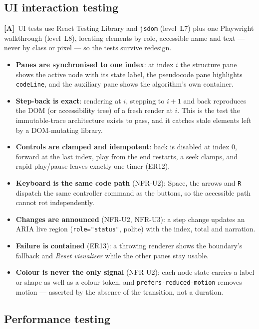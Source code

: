 \documentclass[11pt,a4paper]{article}
\newcommand{\A}{\textcolor{asmc}{\textbf{[A]}}}     %
\newcommand{\ct}[1]{\texttt{#1}}
\begin{document}
\subsection{UI interaction testing}

\A\ UI tests use React Testing Library and \ct{jsdom} (level~L7) plus one Playwright
walkthrough (level~L8), locating elements by role, accessible name and text --- never by class
or pixel --- so the tests survive redesign.

\begin{itemize}[leftmargin=1.4em,topsep=2pt,itemsep=1pt]
  \item \textbf{Panes are synchronised to one index}: at index $i$ the structure pane shows the
        active node with its state label, the pseudocode pane highlights \ct{codeLine}, and the
        auxiliary pane shows the algorithm's own container.
  \item \textbf{Step-back is exact}: rendering at $i$, stepping to $i+1$ and back reproduces the
        DOM (or accessibility tree) of a fresh render at $i$. This is the test the immutable-trace
        architecture exists to pass, and it catches stale elements left by a DOM-mutating library.
  \item \textbf{Controls are clamped and idempotent}: back is disabled at index $0$, forward at
        the last index, play from the end restarts, a seek clamps, and rapid play/pause leaves
        exactly one timer (ER12).
  \item \textbf{Keyboard is the same code path} (NFR-U2): Space, the arrows and \ct{R} dispatch
        the same controller command as the buttons, so the accessible path cannot rot
        independently.
  \item \textbf{Changes are announced} (NFR-U2, NFR-U3): a step change updates an ARIA live
        region (\ct{role="status"}, polite) with the index, total and narration.
  \item \textbf{Failure is contained} (ER13): a throwing renderer shows the boundary's fallback
        and \emph{Reset visualiser} while the other panes stay usable.
  \item \textbf{Colour is never the only signal} (NFR-U2): each node state carries a label or
        shape as well as a colour token, and \ct{prefers-reduced-motion} removes motion ---
        asserted by the absence of the transition, not a duration.
\end{itemize}

\subsection{Performance testing}
\end{document}
